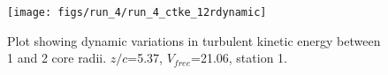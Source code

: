 \begin{figure}[H]
\centering
\texttt{[image: figs/run\_4/run\_4\_ctke\_12rdynamic]}
\caption{Plot showing dynamic variations in turbulent kinetic energy between 1 and 2 core radii. $z/c$=5.37, $V_{free}$=21.06, station 1.}
\label{fig:run_4_ctke_12rdynamic}
\end{figure}


